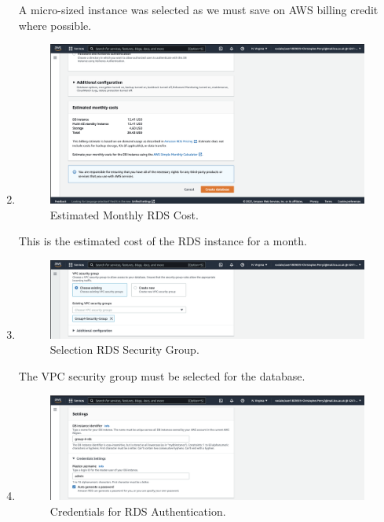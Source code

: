 \begin{enumerate}
    A micro-sized instance was selected as we must save on AWS billing credit where possible.

    \item
    \begin{figure}[H]
        \centering
        \includegraphics[width=\textwidth]{resources/rds/rds-monthly-costs}
        \caption{Estimated Monthly RDS Cost.}
        \label{fig:rds-costs}
    \end{figure}

    This is the estimated cost of the RDS instance for a month.

    \item
    \begin{figure}[H]
        \centering
        \includegraphics[width=\textwidth]{resources/rds/rds-security-group}
        \caption{Selection RDS Security Group.}
        \label{fig:rds-security}
    \end{figure}
    The VPC security group must be selected for the database.

    \item
    \begin{figure}[H]
        \centering
        \includegraphics[width=\textwidth]{resources/rds/rds-settings}
        \caption{Credentials for RDS Authentication.}
        \label{fig:rds-settings}
    \end{figure}


\end{enumerate}
